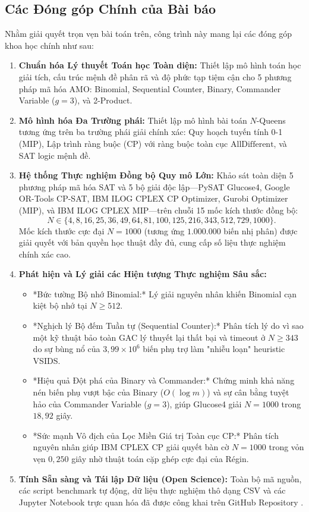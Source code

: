\documentclass[a4paper,fleqn]{cas-sc}
\begin{document}
\subsection{Các Đóng góp Chính của Bài báo}
Nhằm giải quyết trọn vẹn bài toán trên, công trình này mang lại các đóng góp khoa học chính như sau:
\begin{enumerate}
    \item \textbf{Chuẩn hóa Lý thuyết Toán học Toàn diện:} Thiết lập mô hình toán học giải tích, cấu trúc mệnh đề phân rã và độ phức tạp tiệm cận cho 5 phương pháp mã hóa AMO: Binomial, Sequential Counter, Binary, Commander Variable ($g=3$), và 2-Product.
    \item \textbf{Mô hình hóa Đa Trường phái:} Thiết lập mô hình bài toán $N$-Queens tương ứng trên ba trường phái giải chính xác: Quy hoạch tuyến tính 0-1 (MIP), Lập trình ràng buộc (CP) với ràng buộc toàn cục $\text{AllDifferent}$, và SAT logic mệnh đề.
    \item \textbf{Hệ thống Thực nghiệm Đồng bộ Quy mô Lớn:} Khảo sát toàn diện 5 phương pháp mã hóa SAT và 5 bộ giải độc lập---PySAT Glucose4, Google OR-Tools CP-SAT, IBM ILOG CPLEX CP Optimizer, Gurobi Optimizer (MIP), và IBM ILOG CPLEX MIP---trên chuỗi 15 mốc kích thước đồng bộ:
    \[
    N \in \{4, 8, 16, 25, 36, 49, 64, 81, 100, 125, 216, 343, 512, 729, 1000\}.
    \]
    Mốc kích thước cực đại $N = 1000$ (tương ứng $1.000.000$ biến nhị phân) được giải quyết với bản quyền học thuật đầy đủ, cung cấp số liệu thực nghiệm chính xác cao.
    \item \textbf{Phát hiện và Lý giải các Hiện tượng Thực nghiệm Sâu sắc:}
    \begin{itemize}
        \item *Bức tường Bộ nhớ Binomial:* Lý giải nguyên nhân khiến Binomial cạn kiệt bộ nhớ tại $N \ge 512$.
        \item *Nghịch lý Bộ đếm Tuần tự (Sequential Counter):* Phân tích lý do vì sao một kỹ thuật bảo toàn GAC lý thuyết lại thất bại và timeout ở $N \ge 343$ do sự bùng nổ của $3{,}99 \times 10^6$ biến phụ trợ làm "nhiễu loạn" heuristic VSIDS.
        \item *Hiệu quả Đột phá của Binary và Commander:* Chứng minh khả năng nén biến phụ vượt bậc của Binary ($O(\log m)$) và sự cân bằng tuyệt hảo của Commander Variable ($g=3$), giúp Glucose4 giải $N = 1000$ trong $18{,}92$ giây.
        \item *Sức mạnh Vô địch của Lọc Miền Giá trị Toàn cục CP:* Phân tích nguyên nhân giúp IBM CPLEX CP giải quyết bàn cờ $N = 1000$ trong vỏn vẹn $0{,}250$ giây nhờ thuật toán cặp ghép cực đại của Régin.
    \end{itemize}
    \item \textbf{Tính Sẵn sàng và Tái lập Dữ liệu (Open Science):} Toàn bộ mã nguồn, các script benchmark tự động, dữ liệu thực nghiệm thô dạng CSV và các Jupyter Notebook trực quan hóa đã được công khai trên GitHub Repository \cite{hung2026github}.
\end{enumerate}
\end{document}
